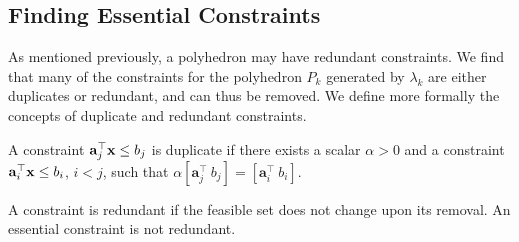 
\subsection{Finding Essential Constraints} \label{Essential}
As mentioned previously, a polyhedron may have redundant constraints. We find that many of the constraints for the polyhedron $P_k$ generated by $\lambda_k$ are either duplicates or redundant, and can thus be removed. We define more formally the concepts of duplicate and redundant constraints.
\begin{definition}
A constraint $\mathbf{a}_j^{\top} \mathbf{x} \le b_j$ is duplicate if there exists a scalar $\alpha > 0$ and a constraint $\mathbf{a}_i^{\top} \mathbf{x} \le b_i$, $i<j$, such that $\alpha [\mathbf{a}^\top_j\ b_j] = [\mathbf{a}^\top_i\ b_i]$. \label{def: duplicate}
\end{definition}
\begin{definition}
A constraint is redundant if the feasible set does not change upon its removal. An essential constraint is not redundant. \label{def: redundant}
\end{definition}

